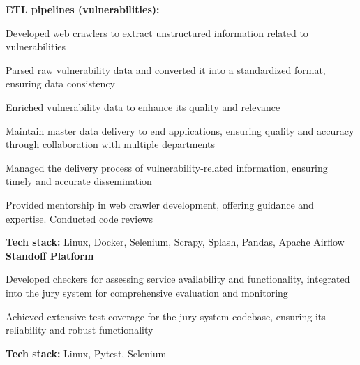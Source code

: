 \documentclass[a4paper]{MagicalCV}
\begin{document}
\begin{minipage}[t]{0.64\textwidth}
\textbf{ETL pipelines (vulnerabilities):}
\begin{tightemize}
  \item Developed web crawlers to extract unstructured information related to vulnerabilities
  \item Parsed raw vulnerability data and converted it into a standardized format, ensuring data consistency
  \item Enriched vulnerability data to enhance its quality and relevance
  \item Maintain master data delivery to end applications, ensuring quality and accuracy through collaboration with multiple departments
  \item Managed the delivery process of vulnerability-related information, ensuring timely and accurate dissemination
  \item Provided mentorship in web crawler development, offering guidance and expertise. Conducted code reviews
\end{tightemize}
\textbf{Tech stack:} Linux, Docker, Selenium, Scrapy, Splash, Pandas, Apache Airflow \\
\vspace{\topsep}
\textbf{Standoff Platform}
\begin{tightemize}
  \item Developed checkers for assessing service availability and functionality, integrated into the jury system for comprehensive evaluation and monitoring
  \item Achieved extensive test coverage for the jury system codebase, ensuring its reliability and robust functionality
\end{tightemize}
\textbf{Tech stack:} Linux, Pytest, Selenium
\sectionsep


\end{minipage} 
\end{document}
